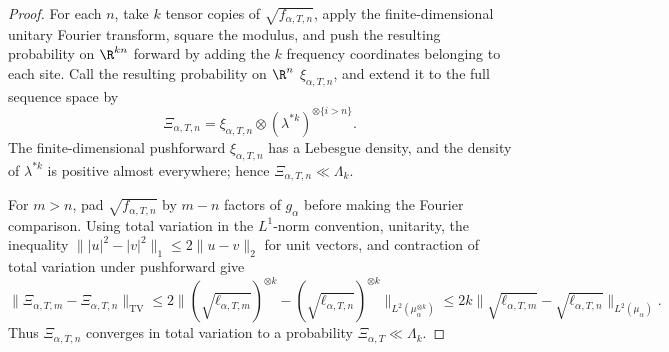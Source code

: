 \begin{proof}
For each \(n\), take \(k\) tensor copies of
\(\sqrt{f_{\alpha,T,n}}\), apply the
finite-dimensional unitary Fourier transform, square the modulus, and push
the resulting probability on \(\R^{kn}\) forward by adding the \(k\)
frequency coordinates belonging to each site.
Call the resulting probability on \(\R^n\) \(\xi_{\alpha,T,n}\), and extend it to
the full sequence space by
\begin{equation}
 \Xi_{\alpha,T,n}=\xi_{\alpha,T,n}\otimes
       (\lambda^{*k})^{\otimes\{i>n\}}.
 \label{eq:stable-fourier-transfer-approximants}
\end{equation}
The finite-dimensional pushforward \(\xi_{\alpha,T,n}\) has a Lebesgue density, and
the density of \(\lambda^{*k}\) is positive almost everywhere; hence
\(\Xi_{\alpha,T,n}\ll\Lambda_k\).

For \(m>n\), pad \(\sqrt{f_{\alpha,T,n}}\) by \(m-n\) factors of
\(g_\alpha\) before making the Fourier comparison.
Using total variation in the \(L^1\)-norm convention, unitarity, the inequality
\(\||u|^2-|v|^2\|_1\le2\|u-v\|_2\) for unit vectors, and contraction of
total variation under pushforward give
\begin{equation}
 \|\Xi_{\alpha,T,m}-\Xi_{\alpha,T,n}\|_{\mathrm{TV}}
 \le2\|(\sqrt{\ell_{\alpha,T,m}})^{\otimes k}
           -(\sqrt{\ell_{\alpha,T,n}})^{\otimes k}\|_{L^2(\mu_\alpha^{\otimes k})}
 \le2k\|\sqrt{\ell_{\alpha,T,m}}
           -\sqrt{\ell_{\alpha,T,n}}\|_{L^2(\mu_\alpha)}.
 \label{eq:stable-fourier-transfer-tv-bound}
\end{equation}
Thus \(\Xi_{\alpha,T,n}\) converges in total variation to a probability
\(\Xi_{\alpha,T}\ll\Lambda_k\).


\end{proof}
